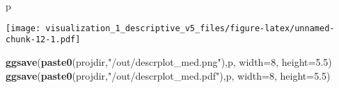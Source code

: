 \documentclass[
]{article}
\newenvironment{Shaded}{\begin{snugshade}}{\end{snugshade}}
\newcommand{\DataTypeTok}[1]{\textcolor[rgb]{0.13,0.29,0.53}{#1}}
\newcommand{\DecValTok}[1]{\textcolor[rgb]{0.00,0.00,0.81}{#1}}
\newcommand{\FloatTok}[1]{\textcolor[rgb]{0.00,0.00,0.81}{#1}}
\newcommand{\KeywordTok}[1]{\textcolor[rgb]{0.13,0.29,0.53}{\textbf{#1}}}
\newcommand{\NormalTok}[1]{#1}
\newcommand{\StringTok}[1]{\textcolor[rgb]{0.31,0.60,0.02}{#1}}
\begin{document}
\begin{Shaded}
\begin{Highlighting}[]
\NormalTok{p}
\end{Highlighting}
\end{Shaded}

\texttt{[image: visualization\_1\_descriptive\_v5\_files/figure-latex/unnamed-chunk-12-1.pdf]}

\begin{Shaded}
\begin{Highlighting}[]
\KeywordTok{ggsave}\NormalTok{(}\KeywordTok{paste0}\NormalTok{(projdir,}\StringTok{"/out/descrplot_med.png"}\NormalTok{),p, }\DataTypeTok{width=}\DecValTok{8}\NormalTok{, }\DataTypeTok{height=}\FloatTok{5.5}\NormalTok{)}
\KeywordTok{ggsave}\NormalTok{(}\KeywordTok{paste0}\NormalTok{(projdir,}\StringTok{"/out/descrplot_med.pdf"}\NormalTok{),p, }\DataTypeTok{width=}\DecValTok{8}\NormalTok{, }\DataTypeTok{height=}\FloatTok{5.5}\NormalTok{)}
\end{Highlighting}
\end{Shaded}
\end{document}
